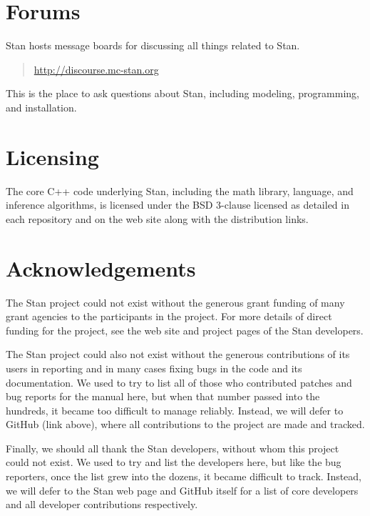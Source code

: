 \section*{Forums}

Stan hosts message boards for discussing all things
related to Stan.  
%
\begin{quote}
\url{http://discourse.mc-stan.org}
\end{quote}
%
This is the place to ask questions about Stan, including modeling,
programming, and installation.


\section*{Licensing}

The core C++ code underlying Stan, including the math library,
language, and inference algorithms, is licensed under the BSD 3-clause
licensed as detailed in each repository and on the web site along
with the distribution links.


\section*{Acknowledgements}

The Stan project could not exist without the generous grant
funding of many grant agencies to the participants in the project.
For more details of direct funding for the project, see the web site
and project pages of the Stan developers.

The Stan project could also not exist without the generous
contributions of its users in reporting and in many cases fixing bugs
in the code and its documentation.  We used to try to list all of
those who contributed patches and bug reports for the manual here, but
when that number passed into the hundreds, it became too difficult to
manage reliably.  Instead, we will defer to GitHub (link above), where
all contributions to the project are made and tracked.

Finally, we should all thank the Stan developers, without whom this
project could not exist.  We used to try and list the developers here,
but like the bug reporters, once the list grew into the dozens, it
became difficult to track.  Instead, we will defer to the Stan web
page and GitHub itself for a list of core developers and all developer
contributions respectively.
